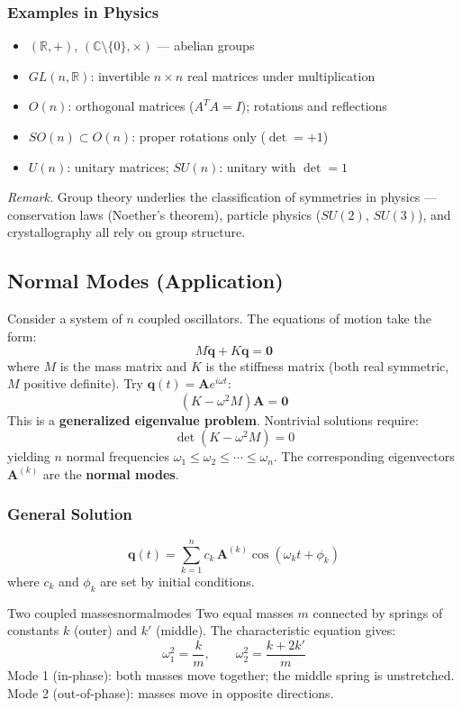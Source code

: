 \documentclass[11pt, letterpaper]{article}
\theoremstyle{plain}
\newenvironment{remark}{\smallskip\noindent\textit{Remark.}}{\smallskip}
\newcommand{\vv}[1]{\bm{#1}}
\begin{document}
\subsubsection*{Examples in Physics}
\begin{itemize}
    \item $(\mathbb{R}, +)$, $(\mathbb{C}\setminus\{0\}, \times)$ — abelian groups
    \item $GL(n,\mathbb{R})$: invertible $n\times n$ real matrices under multiplication
    \item $O(n)$: orthogonal matrices ($A^TA = I$); rotations and reflections
    \item $SO(n) \subset O(n)$: proper rotations only ($\det = +1$)
    \item $U(n)$: unitary matrices; $SU(n)$: unitary with $\det = 1$
\end{itemize}

\begin{remark}
    Group theory underlies the classification of symmetries in physics —
    conservation laws (Noether's theorem), particle physics ($SU(2)$, $SU(3)$),
    and crystallography all rely on group structure.
\end{remark}


\subsection{Normal Modes (Application)}

Consider a system of $n$ coupled oscillators. The equations of motion take
the form:
\[
    M\ddot{\vv{q}} + K\vv{q} = \vv{0}
\]
where $M$ is the mass matrix and $K$ is the stiffness matrix (both real
symmetric, $M$ positive definite). Try $\vv{q}(t) = \vv{A}e^{i\omega t}$:
\[
    (K - \omega^2 M)\vv{A} = \vv{0}
\]
This is a \textbf{generalized eigenvalue problem}. Nontrivial solutions
require:
\[
    \det(K - \omega^2 M) = 0
\]
yielding $n$ normal frequencies $\omega_1 \leq \omega_2 \leq \cdots \leq \omega_n$.
The corresponding eigenvectors $\vv{A}^{(k)}$ are the \textbf{normal modes}.

\subsubsection*{General Solution}
\[
    \vv{q}(t) = \sum_{k=1}^n c_k\,\vv{A}^{(k)}\cos(\omega_k t + \phi_k)
\]
where $c_k$ and $\phi_k$ are set by initial conditions.

\begin{example}{Two coupled masses}{normalmodes}
    Two equal masses $m$ connected by springs of constants $k$ (outer)
    and $k'$ (middle). The characteristic equation gives:
    \[
        \omega_1^2 = \frac{k}{m}, \qquad \omega_2^2 = \frac{k + 2k'}{m}
    \]
    Mode 1 (in-phase): both masses move together; the middle spring is
    unstretched. Mode 2 (out-of-phase): masses move in opposite directions.
\end{example}
\end{document}

